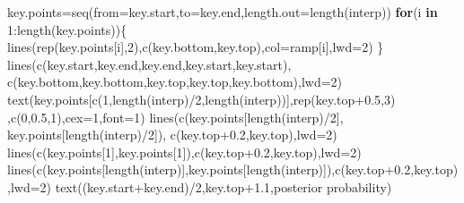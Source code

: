 \documentclass[
]{article}
\newenvironment{Shaded}{\begin{snugshade}}{\end{snugshade}}
\newcommand{\AttributeTok}[1]{\textcolor[rgb]{0.77,0.63,0.00}{#1}}
\newcommand{\ControlFlowTok}[1]{\textcolor[rgb]{0.13,0.29,0.53}{\textbf{#1}}}
\newcommand{\DecValTok}[1]{\textcolor[rgb]{0.00,0.00,0.81}{#1}}
\newcommand{\FloatTok}[1]{\textcolor[rgb]{0.00,0.00,0.81}{#1}}
\newcommand{\FunctionTok}[1]{\textcolor[rgb]{0.00,0.00,0.00}{#1}}
\newcommand{\NormalTok}[1]{#1}
\newcommand{\OtherTok}[1]{\textcolor[rgb]{0.56,0.35,0.01}{#1}}
\newcommand{\SpecialCharTok}[1]{\textcolor[rgb]{0.00,0.00,0.00}{#1}}
\newcommand{\StringTok}[1]{\textcolor[rgb]{0.31,0.60,0.02}{#1}}
\begin{document}
\begin{Shaded}
\begin{Highlighting}[]
\NormalTok{  key.points}\OtherTok{=}\FunctionTok{seq}\NormalTok{(}\AttributeTok{from=}\NormalTok{key.start,}\AttributeTok{to=}\NormalTok{key.end,}\AttributeTok{length.out=}\FunctionTok{length}\NormalTok{(interp))}
  \ControlFlowTok{for}\NormalTok{(i }\ControlFlowTok{in} \DecValTok{1}\SpecialCharTok{:}\FunctionTok{length}\NormalTok{(key.points))\{}
    \FunctionTok{lines}\NormalTok{(}\FunctionTok{rep}\NormalTok{(key.points[i],}\DecValTok{2}\NormalTok{),}\FunctionTok{c}\NormalTok{(key.bottom,key.top),}\AttributeTok{col=}\NormalTok{ramp[i],}\AttributeTok{lwd=}\DecValTok{2}\NormalTok{)}
\NormalTok{  \}}
  \FunctionTok{lines}\NormalTok{(}\FunctionTok{c}\NormalTok{(key.start,key.end,key.end,key.start,key.start),}
        \FunctionTok{c}\NormalTok{(key.bottom,key.bottom,key.top,key.top,key.bottom),}\AttributeTok{lwd=}\DecValTok{2}\NormalTok{)}
  \FunctionTok{text}\NormalTok{(key.points[}\FunctionTok{c}\NormalTok{(}\DecValTok{1}\NormalTok{,}\FunctionTok{length}\NormalTok{(interp)}\SpecialCharTok{/}\DecValTok{2}\NormalTok{,}\FunctionTok{length}\NormalTok{(interp))],}\FunctionTok{rep}\NormalTok{(key.top}\FloatTok{+0.5}\NormalTok{,}\DecValTok{3}\NormalTok{)}
\NormalTok{     ,}\FunctionTok{c}\NormalTok{(}\DecValTok{0}\NormalTok{,}\FloatTok{0.5}\NormalTok{,}\DecValTok{1}\NormalTok{),}\AttributeTok{cex=}\DecValTok{1}\NormalTok{,}\AttributeTok{font=}\DecValTok{1}\NormalTok{)}
  \FunctionTok{lines}\NormalTok{(}\FunctionTok{c}\NormalTok{(key.points[}\FunctionTok{length}\NormalTok{(interp)}\SpecialCharTok{/}\DecValTok{2}\NormalTok{],}
\NormalTok{          key.points[}\FunctionTok{length}\NormalTok{(interp)}\SpecialCharTok{/}\DecValTok{2}\NormalTok{]),}
        \FunctionTok{c}\NormalTok{(key.top}\FloatTok{+0.2}\NormalTok{,key.top),}\AttributeTok{lwd=}\DecValTok{2}\NormalTok{)}
  \FunctionTok{lines}\NormalTok{(}\FunctionTok{c}\NormalTok{(key.points[}\DecValTok{1}\NormalTok{],key.points[}\DecValTok{1}\NormalTok{]),}\FunctionTok{c}\NormalTok{(key.top}\FloatTok{+0.2}\NormalTok{,key.top),}\AttributeTok{lwd=}\DecValTok{2}\NormalTok{)}
  \FunctionTok{lines}\NormalTok{(}\FunctionTok{c}\NormalTok{(key.points[}\FunctionTok{length}\NormalTok{(interp)],key.points[}\FunctionTok{length}\NormalTok{(interp)]),}\FunctionTok{c}\NormalTok{(key.top}\FloatTok{+0.2}\NormalTok{,key.top),}\AttributeTok{lwd=}\DecValTok{2}\NormalTok{)}
  \FunctionTok{text}\NormalTok{((key.start}\SpecialCharTok{+}\NormalTok{key.end)}\SpecialCharTok{/}\DecValTok{2}\NormalTok{,key.top}\FloatTok{+1.1}\NormalTok{,}\StringTok{\textquotesingle{}posterior probability\textquotesingle{}}\NormalTok{)}


\end{Highlighting}
\end{Shaded}
\end{document}
